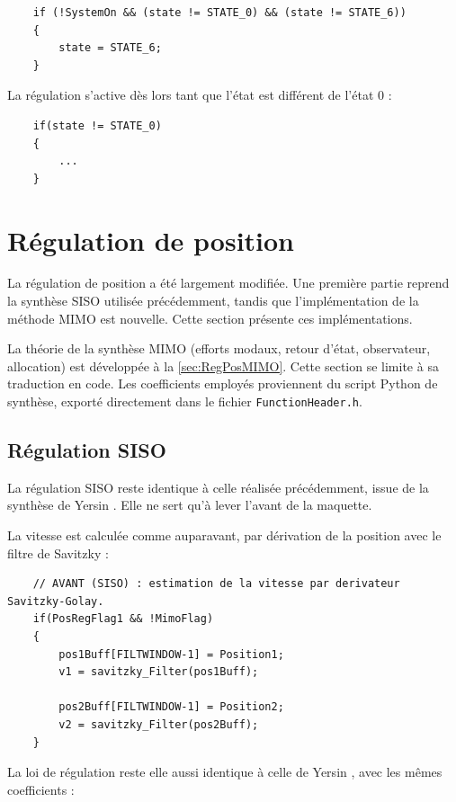 \begin{verbatim}
    if (!SystemOn && (state != STATE_0) && (state != STATE_6))
    {
        state = STATE_6;
    }
\end{verbatim}

La régulation s'active dès lors tant que l'état est différent de l'état 0 :

\begin{verbatim}
    if(state != STATE_0)
    {
        ...
    }
\end{verbatim}

\section{Régulation de position}
La régulation de position a été largement modifiée. Une première partie reprend la synthèse SISO utilisée précédemment, tandis que l'implémentation de la méthode MIMO est nouvelle. Cette section présente ces implémentations.

La théorie de la synthèse MIMO (efforts modaux, retour d'état, observateur, allocation) est développée à la \autoref{sec:RegPosMIMO}. Cette section se limite à sa traduction en code. Les coefficients employés proviennent du script Python de synthèse, exporté directement dans le fichier \texttt{FunctionHeader.h}.

\subsection{Régulation SISO}
La régulation SISO reste identique à celle réalisée précédemment, issue de la synthèse de Yersin \cite{Yersin}. Elle ne sert qu'à lever l'avant de la maquette.

La vitesse est calculée comme auparavant, par dérivation de la position avec le filtre de Savitzky :

\begin{verbatim}
    // AVANT (SISO) : estimation de la vitesse par derivateur Savitzky-Golay.
    if(PosRegFlag1 && !MimoFlag)
    {
        pos1Buff[FILTWINDOW-1] = Position1;
        v1 = savitzky_Filter(pos1Buff);

        pos2Buff[FILTWINDOW-1] = Position2;
        v2 = savitzky_Filter(pos2Buff);
    }
\end{verbatim}

La loi de régulation reste elle aussi identique à celle de Yersin \cite{Yersin}, avec les mêmes coefficients :

